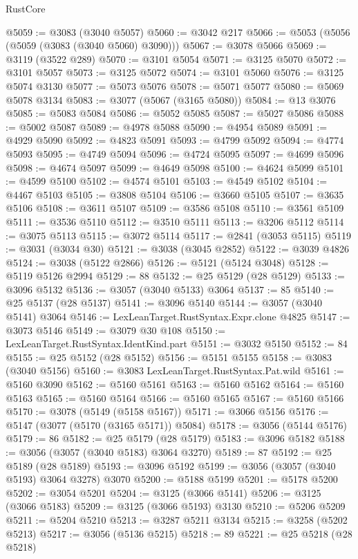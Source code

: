 \begin{lexlean}{RustCore}
\begin{coremodule}
@5059 := @3083 (@3040 @5057)
@5060 := @3042 @217
@5066 := @5053 (@5056 (@5059 (@3083 (@3040 @5060) @3090)))
@5067 := @3078 @5066
@5069 := @3119 (@3522 @289)
@5070 := @3101 @5054
@5071 := @3125 @5070
@5072 := @3101 @5057
@5073 := @3125 @5072
@5074 := @3101 @5060
@5076 := @3125 @5074 @3130
@5077 := @5073 @5076
@5078 := @5071 @5077
@5080 := @5069 @5078 @3134
@5083 := @3077 (@5067 (@3165 @5080))
@5084 := @13 @3076
@5085 := @5083 @5084
@5086 := @5052 @5085
@5087 := @5027 @5086
@5088 := @5002 @5087
@5089 := @4978 @5088
@5090 := @4954 @5089
@5091 := @4929 @5090
@5092 := @4823 @5091
@5093 := @4799 @5092
@5094 := @4774 @5093
@5095 := @4749 @5094
@5096 := @4724 @5095
@5097 := @4699 @5096
@5098 := @4674 @5097
@5099 := @4649 @5098
@5100 := @4624 @5099
@5101 := @4599 @5100
@5102 := @4574 @5101
@5103 := @4549 @5102
@5104 := @4467 @5103
@5105 := @3808 @5104
@5106 := @3660 @5105
@5107 := @3635 @5106
@5108 := @3611 @5107
@5109 := @3586 @5108
@5110 := @3561 @5109
@5111 := @3536 @5110
@5112 := @3510 @5111
@5113 := @3206 @5112
@5114 := @3075 @5113
@5115 := @3072 @5114
@5117 := @2841 (@3053 @5115)
@5119 := @3031 (@3034 @30)
@5121 := @3038 (@3045 @2852)
@5122 := @3039 @4826
@5124 := @3038 (@5122 @2866)
@5126 := @5121 (@5124 @3048)
@5128 := @5119 @5126 @2994
@5129 := 88
@5132 := @25 @5129 (@28 @5129)
@5133 := @3096 @5132
@5136 := @3057 (@3040 @5133) @3064
@5137 := 85
@5140 := @25 @5137 (@28 @5137)
@5141 := @3096 @5140
@5144 := @3057 (@3040 @5141) @3064
@5146 := LexLeanTarget.RustSyntax.Expr.clone @4825
@5147 := @3073 @5146
@5149 := @3079 @30 @108
@5150 := LexLeanTarget.RustSyntax.IdentKind.part
@5151 := @3032 @5150
@5152 := 84
@5155 := @25 @5152 (@28 @5152)
@5156 := @5151 @5155
@5158 := @3083 (@3040 @5156)
@5160 := @3083 LexLeanTarget.RustSyntax.Pat.wild
@5161 := @5160 @3090
@5162 := @5160 @5161
@5163 := @5160 @5162
@5164 := @5160 @5163
@5165 := @5160 @5164
@5166 := @5160 @5165
@5167 := @5160 @5166
@5170 := @3078 (@5149 (@5158 @5167))
@5171 := @3066 @5156
@5176 := @5147 (@3077 (@5170 (@3165 @5171)) @5084)
@5178 := @3056 (@5144 @5176)
@5179 := 86
@5182 := @25 @5179 (@28 @5179)
@5183 := @3096 @5182
@5188 := @3056 (@3057 (@3040 @5183) @3064 @3270)
@5189 := 87
@5192 := @25 @5189 (@28 @5189)
@5193 := @3096 @5192
@5199 := @3056 (@3057 (@3040 @5193) @3064 @3278) @3070
@5200 := @5188 @5199
@5201 := @5178 @5200
@5202 := @3054 @5201
@5204 := @3125 (@3066 @5141)
@5206 := @3125 (@3066 @5183)
@5209 := @3125 (@3066 @5193) @3130
@5210 := @5206 @5209
@5211 := @5204 @5210
@5213 := @3287 @5211 @3134
@5215 := @3258 (@5202 @5213)
@5217 := @3056 (@5136 @5215)
@5218 := 89
@5221 := @25 @5218 (@28 @5218)

\end{coremodule}
\end{lexlean}
